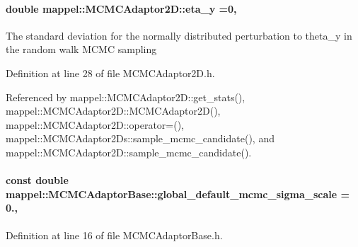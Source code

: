 \paragraph[{\texorpdfstring{eta\+\_\+y}{eta_y}}]{\setlength{\rightskip}{0pt plus 5cm}double mappel\+::\+M\+C\+M\+C\+Adaptor2\+D\+::eta\+\_\+y =0\hspace{0.3cm}{\ttfamily [protected]}, {\ttfamily [inherited]}}\hypertarget{classmappel_1_1MCMCAdaptor2D_a8e49652147538fe2a12943522f1a8b30}{}\label{classmappel_1_1MCMCAdaptor2D_a8e49652147538fe2a12943522f1a8b30}
The standard deviation for the normally distributed perturbation to theta\+\_\+y in the random walk M\+C\+MC sampling 

Definition at line 28 of file M\+C\+M\+C\+Adaptor2\+D.\+h.



Referenced by mappel\+::\+M\+C\+M\+C\+Adaptor2\+D\+::get\+\_\+stats(), mappel\+::\+M\+C\+M\+C\+Adaptor2\+D\+::\+M\+C\+M\+C\+Adaptor2\+D(), mappel\+::\+M\+C\+M\+C\+Adaptor2\+D\+::operator=(), mappel\+::\+M\+C\+M\+C\+Adaptor2\+Ds\+::sample\+\_\+mcmc\+\_\+candidate(), and mappel\+::\+M\+C\+M\+C\+Adaptor2\+D\+::sample\+\_\+mcmc\+\_\+candidate().

\paragraph[{\texorpdfstring{global\+\_\+default\+\_\+mcmc\+\_\+sigma\+\_\+scale}{global_default_mcmc_sigma_scale}}]{\setlength{\rightskip}{0pt plus 5cm}const double mappel\+::\+M\+C\+M\+C\+Adaptor\+Base\+::global\+\_\+default\+\_\+mcmc\+\_\+sigma\+\_\+scale = 0.\hspace{0.3cm}{\ttfamily [static]}, {\ttfamily [inherited]}}\hypertarget{classmappel_1_1MCMCAdaptorBase_a44cebca0e27135c854fa8430d2d89929}{}\label{classmappel_1_1MCMCAdaptorBase_a44cebca0e27135c854fa8430d2d89929}


Definition at line 16 of file M\+C\+M\+C\+Adaptor\+Base.\+h.



